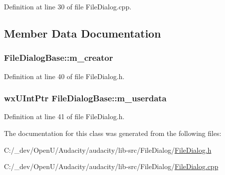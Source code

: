 Definition at line 30 of file File\+Dialog.\+cpp.



\subsection{Member Data Documentation}
\subsubsection[{\texorpdfstring{m\+\_\+creator}{m_creator}}]{ File\+Dialog\+Base\+::m\+\_\+creator\hspace{0.3cm}{\ttfamily [protected]}}\hypertarget{class_file_dialog_base_acefe406967af6b4fc57deeb13b067187}{}\label{class_file_dialog_base_acefe406967af6b4fc57deeb13b067187}


Definition at line 40 of file File\+Dialog.\+h.

\subsubsection[{\texorpdfstring{m\+\_\+userdata}{m_userdata}}]{\setlength{\rightskip}{0pt plus 5cm}wx\+U\+Int\+Ptr File\+Dialog\+Base\+::m\+\_\+userdata\hspace{0.3cm}{\ttfamily [protected]}}\hypertarget{class_file_dialog_base_a95a0ee0625b9bb5ebd397feda56adc2f}{}\label{class_file_dialog_base_a95a0ee0625b9bb5ebd397feda56adc2f}


Definition at line 41 of file File\+Dialog.\+h.



The documentation for this class was generated from the following files\+:\begin{DoxyCompactItemize}
\item 
C\+:/\+\_\+dev/\+Open\+U/\+Audacity/audacity/lib-\/src/\+File\+Dialog/\hyperlink{_file_dialog_8h}{File\+Dialog.\+h}\item 
C\+:/\+\_\+dev/\+Open\+U/\+Audacity/audacity/lib-\/src/\+File\+Dialog/\hyperlink{_file_dialog_8cpp}{File\+Dialog.\+cpp}\end{DoxyCompactItemize}
